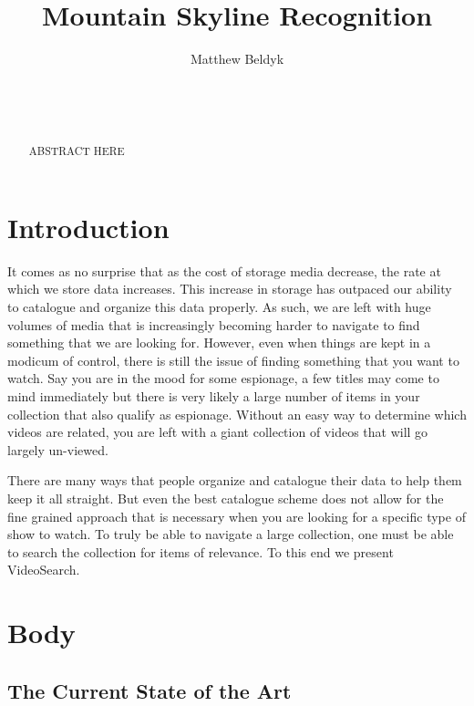 \documentclass{acm_proc_article-sp}
\begin{document}
\title{Mountain Skyline Recognition}



%
\author{
\alignauthor
Matthew Beldyk\\
       \\
       \\
       \\
}

\maketitle
\begin{abstract}

ABSTRACT HERE
\end{abstract}

\section{Introduction}
It comes as no surprise that as the cost of storage media decrease, the rate at which we store data increases. This increase in storage has outpaced our ability to catalogue and organize this data properly. As such, we are left with huge volumes of media that is increasingly becoming harder to navigate to find something that we are looking for. However, even when things are kept in a modicum of control, there is still the issue of finding something that you want to watch. Say you are in the mood for some espionage, a few titles may come to mind immediately but there is very likely a large number of items in your collection that also qualify as espionage. Without an easy way to determine which videos are related, you are left with a giant collection of videos that will go largely un-viewed.

    There are many ways that people organize and catalogue their data to help them keep it all straight. But even the best catalogue scheme does not allow for the fine grained approach that is necessary when you are looking for a specific type of show to watch. To truly be able to navigate a large collection, one must be able to search the collection for items of relevance. To this end we present VideoSearch.  
\section{Body}
\subsection{The Current State of the Art}
\end{document}

